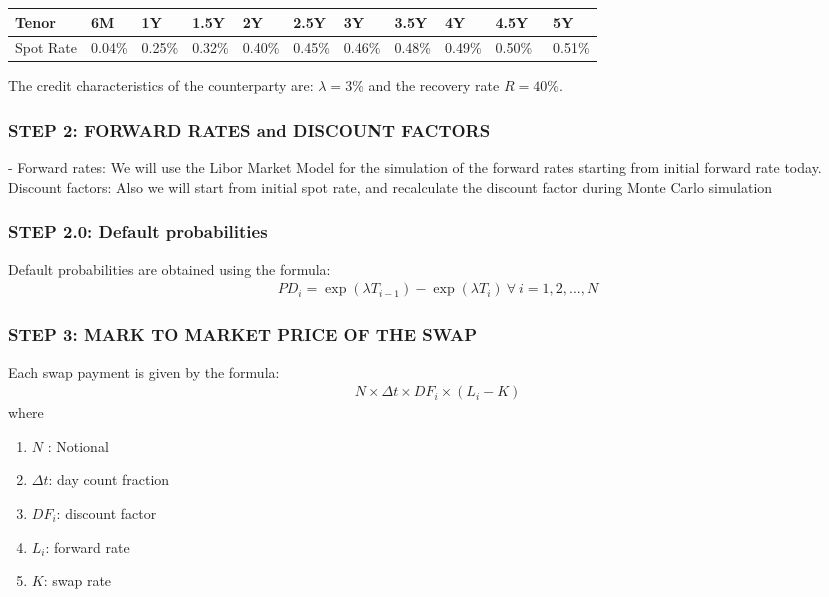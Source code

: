\documentclass[11pt]{article}
\numberwithin{equation}{subsection}
\begin{document}
\vskip 0.2cm 		
{
	\begin{center}
	\begin{tabular}{lllllllllll}
		\hline
		Tenor & 6M & 1Y & 1.5Y & 2Y & 2.5Y & 3Y &  3.5Y &  4Y &  4.5Y & 5Y \\
		\hline
		Spot Rate & 0.04\% & 0.25\% & 0.32\% & 0.40\% & 0.45\% & 0.46\% & 0.48\% & 0.49\% & 0.50\%\ & 0.51\%  \\
	\end{tabular}
	\end{center}
}
\vskip 0.4cm


\noindent The credit characteristics of the counterparty are:
\(\lambda=3\%\) and the recovery rate \(R=40\%\). 
\subsubsection{STEP 2: FORWARD RATES and DISCOUNT FACTORS}
- Forward rates:  We will use the Libor Market Model for the simulation of the forward rates starting from initial forward rate today.
\noindent Discount factors: Also we will start from initial spot rate, and recalculate the discount factor during Monte Carlo simulation
\subsubsection{STEP 2.0: Default probabilities}
\noindent Default probabilities are obtained using the formula:
\begin{eqnarray*}
	PD_{i}= \exp(\lambda T_{i-1})-\exp(\lambda T_{i}) \ \forall \ i =1,2,...,N
\end{eqnarray*}

\subsubsection{STEP 3: MARK TO MARKET PRICE OF THE SWAP}
Each swap payment is given by the formula:
\begin{eqnarray*}
	N \times \Delta t \times DF_i \times (L_i - K) 
\end{eqnarray*}
where 
\begin{enumerate}
\item \(N\) : Notional
\item \(\Delta t\): day count fraction
\item \(DF_i\): discount factor
\item \(L_i\): forward rate
\item \(K\): swap rate 
\end{enumerate}
\end{document}

